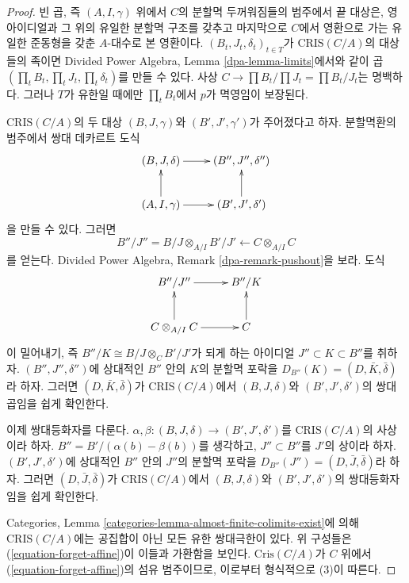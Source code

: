 \begin{proof}
빈 곱, 즉 $(A, I, \gamma)$ 위에서 $C$의 분할멱 두꺼워짐들의
범주에서 끝 대상은, 영 아이디얼과 그 위의 유일한 분할멱 구조를
갖추고 마지막으로 $C$에서 영환으로 가는 유일한 준동형을 갖춘
$A$-대수로 본 영환이다. $(B_t, J_t, \delta_t)_{t \in T}$가
$\text{CRIS}(C/A)$의 대상들의 족이면 Divided Power Algebra,
Lemma \ref{dpa-lemma-limits}에서와 같이 곱
$(\prod_t B_t, \prod_t J_t, \prod_t \delta_t)$를 만들 수 있다.
사상 $C \to \prod B_t/\prod J_t = \prod B_t/J_t$는 명백하다.
그러나 $T$가 유한일 때에만 $\prod_t B_t$에서 $p$가 멱영임이 보장된다.

\medskip\noindent
$\text{CRIS}(C/A)$의 두 대상 $(B, J, \gamma)$와
$(B', J', \gamma')$가 주어졌다고 하자. 분할멱환의 범주에서
쌍대 데카르트 도식
$$
\xymatrix{
(B, J, \delta) \ar[r] & (B'', J'', \delta'') \\
(A, I, \gamma) \ar[r] \ar[u] & (B', J', \delta') \ar[u]
}
$$
을 만들 수 있다. 그러면
$$
B''/J'' = B/J \otimes_{A/I} B'/J' \longleftarrow C \otimes_{A/I} C
$$
를 얻는다. Divided Power Algebra,
Remark \ref{dpa-remark-pushout}을 보라. 도식
$$
\xymatrix{
B''/J'' \ar[r] & B''/K \\
C \otimes_{A/I} C \ar[r] \ar[u] & C \ar[u]
}
$$
이 밀어내기, 즉 $B''/K \cong B/J \otimes_C B'/J'$가 되게 하는
아이디얼 $J'' \subset K \subset B''$를 취하자.
$(B'', J'', \delta'')$에 상대적인 $B''$ 안의 $K$의 분할멱 포락을
$D_{B''}(K) = (D, \bar K, \bar \delta)$라 하자.
그러면 $(D, \bar K, \bar \delta)$가 $\text{CRIS}(C/A)$에서
$(B, J, \delta)$와 $(B', J', \delta')$의 쌍대곱임을 쉽게 확인한다.

\medskip\noindent
이제 쌍대등화자를 다룬다. $\alpha, \beta : (B, J, \delta) \to
(B', J', \delta')$를 $\text{CRIS}(C/A)$의 사상이라 하자.
$B'' = B'/ (\alpha(b) - \beta(b))$를 생각하고,
$J'' \subset B''$를 $J'$의 상이라 하자. $(B', J', \delta')$에
상대적인 $B''$ 안의 $J''$의 분할멱 포락을
$D_{B''}(J'') = (D, \bar J, \bar\delta)$라 하자.
그러면 $(D, \bar J, \bar \delta)$가 $\text{CRIS}(C/A)$에서
$(B, J, \delta)$와 $(B', J', \delta')$의 쌍대등화자임을 쉽게 확인한다.

\medskip\noindent
Categories, Lemma \ref{categories-lemma-almost-finite-colimits-exist}에 의해
$\text{CRIS}(C/A)$에는 공집합이 아닌 모든 유한 쌍대극한이 있다.
위 구성들은 (\ref{equation-forget-affine})이 이들과 가환함을 보인다.
$\text{Cris}(C/A)$가 $C$ 위에서 (\ref{equation-forget-affine})의
섬유 범주이므로, 이로부터 형식적으로 (3)이 따른다.
\end{proof}

